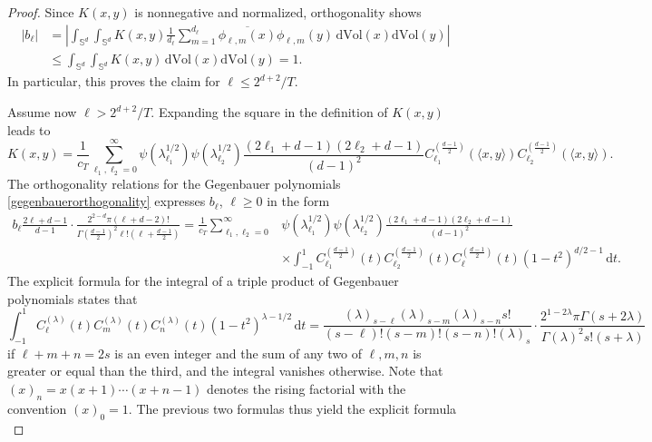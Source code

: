 \documentclass[11pt,a4paper]{article}
\theoremstyle{definition}
\begin{document}
\begin{proof} Since $K(x,y)$ is nonnegative and normalized, orthogonality shows
\[ \begin{split} |b_{\ell}| &= \left| \int_{\mathbb{S}^d} \int_{\mathbb{S}^d} K(x,y) \frac{1}{d_{\ell}} \sum_{m=1}^{d_{\ell}} \overline{\phi_{\ell,m}(x)} \phi_{\ell,m}(y) \, \mathrm{d} \mathrm{Vol}(x) \mathrm{d}\mathrm{Vol}(y) \right| \\ &\le \int_{\mathbb{S}^d} \int_{\mathbb{S}^d} K(x,y) \, \mathrm{d} \mathrm{Vol}(x) \mathrm{d}\mathrm{Vol}(y) = 1 . \end{split} \]
In particular, this proves the claim for $\ell \le 2^{d+2}/T$.

Assume now $\ell > 2^{d+2}/T$. Expanding the square in the definition of $K(x,y)$ leads to
\[ K(x,y) = \frac{1}{c_T} \sum_{\ell_1, \ell_2=0}^{\infty} \psi (\lambda_{\ell_1}^{1/2}) \psi (\lambda_{\ell_2}^{1/2}) \frac{(2 \ell_1+d-1)(2\ell_2 +d-1)}{(d-1)^2} C_{\ell_1}^{(\frac{d-1}{2})} (\langle x, y \rangle) C_{\ell_2}^{(\frac{d-1}{2})} (\langle x, y \rangle) . \]
The orthogonality relations for the Gegenbauer polynomials \eqref{gegenbauerorthogonality} expresses $b_{\ell}$, $\ell \ge 0$ in the form
\[ \begin{split} b_{\ell} \frac{2\ell +d-1}{d-1} \cdot \frac{2^{2-d}\pi (\ell+d-2)!}{\Gamma \left( \frac{d-1}{2} \right)^2 \ell!  \left( \ell +\frac{d-1}{2} \right)} = \frac{1}{c_T} \sum_{\ell_1, \ell_2=0}^{\infty} &\psi (\lambda_{\ell_1}^{1/2}) \psi (\lambda_{\ell_2}^{1/2}) \frac{(2\ell_1 +d-1)(2\ell_2 +d-1)}{(d-1)^2} \\ &\times \int_{-1}^1 C_{\ell_1}^{(\frac{d-1}{2})}(t) C_{\ell_2}^{(\frac{d-1}{2})}(t) C_{\ell}^{(\frac{d-1}{2})}(t) (1-t^2)^{d/2-1} \, \mathrm{d}t . \end{split} \]
The explicit formula for the integral of a triple product of Gegenbauer polynomials \cite[p.\ 321]{AAR} states that
\[ \int_{-1}^1 C_{\ell}^{(\lambda)}(t) C_{m}^{(\lambda)}(t) C_{n}^{(\lambda)}(t) (1-t^2)^{\lambda-1/2} \, \mathrm{d}t = \frac{(\lambda)_{s-\ell} (\lambda)_{s-m} (\lambda)_{s-n} s!}{(s-\ell)! (s-m)! (s-n)! (\lambda)_s} \cdot \frac{2^{1-2 \lambda} \pi \Gamma (s+2\lambda)}{\Gamma (\lambda)^2 s! (s+\lambda)} \]
if $\ell +m+n=2s$ is an even integer and the sum of any two of $\ell,m,n$ is greater or equal than the third, and the integral vanishes otherwise. Note that $(x)_n=x(x+1)\cdots (x+n-1)$ denotes the rising factorial with the convention $(x)_0=1$. The previous two formulas thus yield the explicit formula
\begin{equation}\label{bell1}

\end{equation}
\end{proof}
\end{document}

